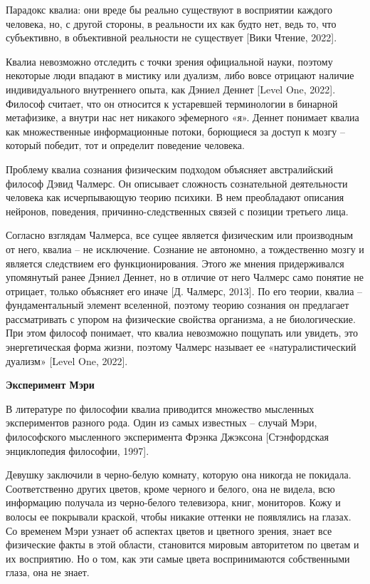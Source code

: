 Парадокс квалиа: они вреде бы реально существуют в восприятии каждого человека, но, с другой стороны, в реальности их как будто нет, ведь то, что субъективно, в объективной реальности не существует [Вики Чтение, 2022].

Квалиа невозможно отследить с точки зрения официальной науки, поэтому некоторые люди впадают в мистику или дуализм, либо вовсе отрицают наличие индивидуального внутреннего опыта, как Дэниел Деннет [Level One, 2022]. Философ считает, что он относится к устаревшей терминологии в бинарной метафизике, а внутри нас нет никакого эфемерного «я». Деннет понимает квалиа как множественные информационные потоки, борющиеся за доступ к мозгу – который победит, тот и определит поведение человека.

Проблему квалиа сознания физическим подходом объясняет австралийский философ Дэвид Чалмерс. Он описывает сложность сознательной деятельности человека как исчерпывающую теорию психики. В нем преобладают описания нейронов, поведения, причинно-следственных связей с позиции третьего лица.

Согласно взглядам Чалмерса, все сущее является физическим или производным от него, квалиа – не исключение. Сознание не автономно, а тождественно мозгу и является следствием его функционирования. Этого же мнения придерживался упомянутый ранее Дэниел Деннет, но в отличие от него Чалмерс само понятие не отрицает, только объясняет его иначе [Д. Чалмерс, 2013]. По его теории, квалиа – фундаментальный элемент вселенной, поэтому теорию сознания он предлагает рассматривать с упором на физические свойства организма, а не биологические. При этом философ понимает, что квалиа невозможно пощупать или увидеть, это энергетическая форма жизни, поэтому Чалмерс называет ее «натуралистический дуализм» [Level One, 2022].

\textbf{Эксперимент Мэри}

В литературе по философии квалиа приводится множество мысленных экспериментов разного рода. Один из самых известных – случай Мэри, философского мысленного эксперимента Фрэнка Джэксона [Стэнфордская энциклопедия философии, 1997].

Девушку заключили в черно-белую комнату, которую она никогда не покидала. Соответственно других цветов, кроме черного и белого, она не видела, всю информацию получала из черно-белого телевизора, книг, мониторов. Кожу и волосы ее покрывали краской, чтобы никакие оттенки не появлялись на глазах. Со временем Мэри узнает об аспектах цветов и цветного зрения, знает все физические факты в этой области, становится мировым авторитетом по цветам и их восприятию. Но о том, как эти самые цвета воспринимаются собственными глаза, она не знает.

